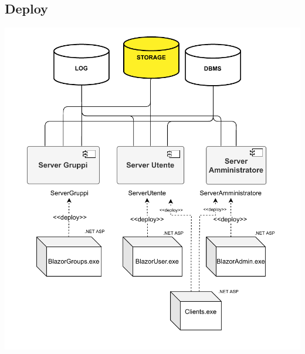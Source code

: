 \subsection*{Deploy}
{}
\vspace{0.5cm}
\begin{adjustwidth}{-0.5cm}{0cm}
\includegraphics[scale=1]{deployment/Diagramma-Sequenza-Deploy.drawio.pdf}
\end{adjustwidth}
